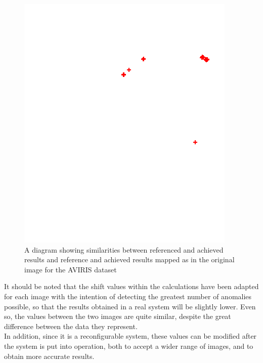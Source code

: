 \begin{figure}[H]
\begin{minipage}{.35\textwidth}
\end{minipage}
\begin{minipage}{.35\textwidth}
  \centering
  \includegraphics[width=\linewidth, frame]{figures/wtc_tar.png}
\end{minipage}
\caption[Results for the AVIRIS dataset]{A diagram showing similarities between referenced and achieved results and reference and achieved results mapped as in the original image for the AVIRIS dataset}
\label{fig:av_3}
\end{figure}
\pagebreak

\noindent\begin{minipage}{\textwidth}
It should be noted that the shift values within the calculations have been adapted for each image with the intention of detecting the greatest number of anomalies possible, so that the results obtained in a real system will be slightly lower. Even so, the values between the two images are quite similar, despite the great difference between the data they represent.
\\
In addition, since it is a reconfigurable system, these values can be modified after the system is put into operation, both to accept a wider range of images, and to obtain more accurate results.
\end{minipage}

